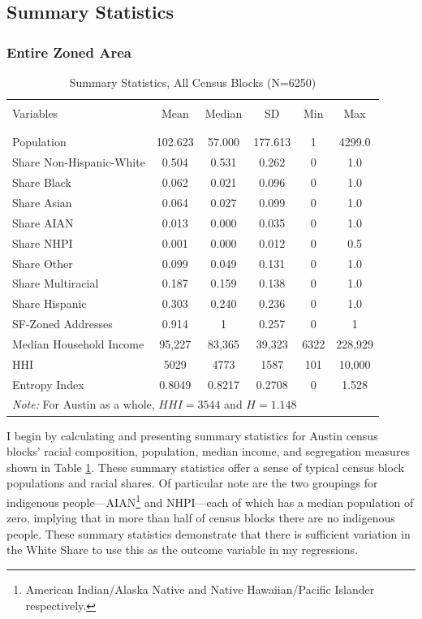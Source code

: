 \documentclass[11pt]{article}
\begin{document}
\subsection{Summary Statistics}

\subsubsection{Entire Zoned Area}


\begin{table}[!htbp] \centering 
  \caption{Summary Statistics, All Census Blocks (N=6250)}
  \label{tab:Austin_summary_stats} 
\begin{tabular}{@{\extracolsep{5pt}}lccccc} 
\hline
\hline
\\[-1.8ex] 
Variables & Mean & Median & SD & Min & Max\\
\\[-1.8ex] \hline\\[-1.8ex] 
Population & 102.623 & 57.000 & 177.613 & 1 & 4299.0 \\
Share Non-Hispanic-White & 0.504 & 0.531 & 0.262 & 0 & 1.0 \\
Share Black & 0.062 & 0.021 & 0.096 & 0 & 1.0 \\
Share Asian & 0.064 & 0.027 & 0.099 & 0 & 1.0 \\
Share AIAN & 0.013 & 0.000 & 0.035 & 0 & 1.0 \\
Share NHPI & 0.001 & 0.000 & 0.012 & 0 & 0.5 \\
Share Other & 0.099 & 0.049 & 0.131 & 0 & 1.0 \\
Share Multiracial & 0.187 & 0.159 & 0.138 & 0 & 1.0 \\
Share Hispanic & 0.303 & 0.240 & 0.236 & 0 & 1.0 \\
SF-Zoned Addresses & 0.914 & 1& 0.257 & 0 & 1\\
Median Household Income & 95,227 & 83,365 & 39,323 & 6322 & 228,929 \\
HHI &5029 & 4773 & 1587 & 101 & 10,000  \\
Entropy Index & 0.8049 &	0.8217 & 0.2708 & 0 & 1.528 \\
\hline
\hline
\multicolumn{6}{l}{\textit{Note:} For Austin as a whole, $HHI=3544$ and $H=1.148$}\\ 
\end{tabular}
\end{table}


I begin by calculating and presenting summary statistics for Austin census blocks’ racial composition, population, median income, and segregation measures shown in Table \ref{tab:Austin_summary_stats}. These summary statistics  offer a sense of typical census block populations and racial shares. Of particular note are the two groupings for indigenous people---AIAN\footnote{American Indian/Alaska Native and Native Hawaiian/Pacific Islander respectively.} and NHPI---each of which has a median population of zero, implying that in more than half of census blocks there are no indigenous people. These summary statistics demonstrate that there is sufficient variation in the White Share to use this as the outcome variable in my regressions.
\end{document}
